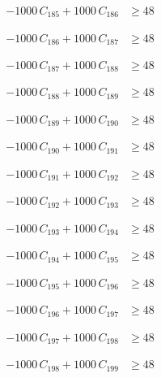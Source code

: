 \documentclass[a4paper,11pt]{article}
\begin{document}
\begin{align}
-1000\,C_{185} + 1000\,C_{186} &\geq 48 \nonumber
\end{align}

\begin{align}
-1000\,C_{186} + 1000\,C_{187} &\geq 48 \nonumber
\end{align}

\begin{align}
-1000\,C_{187} + 1000\,C_{188} &\geq 48 \nonumber
\end{align}

\begin{align}
-1000\,C_{188} + 1000\,C_{189} &\geq 48 \nonumber
\end{align}

\begin{align}
-1000\,C_{189} + 1000\,C_{190} &\geq 48 \nonumber
\end{align}

\begin{align}
-1000\,C_{190} + 1000\,C_{191} &\geq 48 \nonumber
\end{align}

\begin{align}
-1000\,C_{191} + 1000\,C_{192} &\geq 48 \nonumber
\end{align}

\begin{align}
-1000\,C_{192} + 1000\,C_{193} &\geq 48 \nonumber
\end{align}

\begin{align}
-1000\,C_{193} + 1000\,C_{194} &\geq 48 \nonumber
\end{align}

\begin{align}
-1000\,C_{194} + 1000\,C_{195} &\geq 48 \nonumber
\end{align}

\begin{align}
-1000\,C_{195} + 1000\,C_{196} &\geq 48 \nonumber
\end{align}

\begin{align}
-1000\,C_{196} + 1000\,C_{197} &\geq 48 \nonumber
\end{align}

\begin{align}
-1000\,C_{197} + 1000\,C_{198} &\geq 48 \nonumber
\end{align}

\begin{align}
-1000\,C_{198} + 1000\,C_{199} &\geq 48 \nonumber
\end{align}
\end{document}
